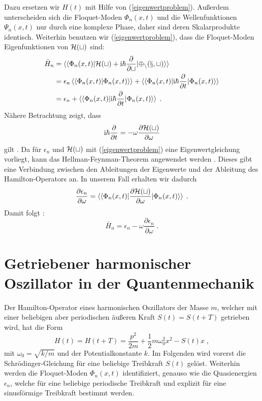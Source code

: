     Dazu ersetzen wir $H(t)$ mit Hilfe von (\ref{eigenwertproblem}).
    Außerdem unterscheiden sich die Floquet-Moden $\Phi_n(x,t)$ und die Wellenfunktionen $\Psi_n(x,t)$ nur durch eine komplexe Phase, daher sind deren Skalarprodukte identisch.
    Weiterhin benutzen wir (\ref{eigenwertproblem}), dass die Floquet-Moden Eigenfunktionen von $\cal{H}(t)$ sind:
    \begin{align}
      \begin{split}
      \bar{H}_n  &= \braket{\braket{\Phi_n(x,t)|\cal{H}(t)+\text{i}\hbar\frac{\partial}{\partial t}|\Phi_n(x,t)}} \\
      &=\epsilon_n \braket{\braket{\Phi_n(x,t)|\Phi_n(x,t)}} + \braket{\braket{\Phi_n(x,t)|\text{i}\hbar\frac{\partial}{\partial t}|\Phi_n(x,t)}} \\
      &= \epsilon_n + \braket{\braket{\Phi_n(x,t)|\text{i}\hbar\frac{\partial}{\partial t}|\Phi_n(x,t)}} \; .
    \end{split}
    \end{align}
    Nähere Betrachtung zeigt, dass
    \begin{equation}
      \text{i}\hbar\frac{\partial}{\partial t} = -\omega \frac{\partial \cal{H}(t)}{\partial \omega}
    \end{equation}
    gilt \cite{haengi}.
    Da für $\epsilon_n$ und $\cal H(t)$ mit (\ref{eigenwertproblem}) eine Eigenwertgleichung vorliegt, kann das Hellman-Feynman-Theorem angewendet werden \cite{hellmann}.
    Dieses gibt eine Verbindung zwischen den Ableitungen der Eigenwerte und der Ableitung des Hamilton-Operators an.
    In unserem Fall erhalten wir dadurch
    \begin{equation}
      \frac{\partial \epsilon_n}{\partial \omega} = \braket{\braket{\Phi_n(x,t)|\frac{\partial \cal H(t)}{\partial \omega}|\Phi_n(x,t)}} \; .
    \end{equation}
    Damit folgt \cite{haengi}:
    \begin{equation}
      \bar{H}_n = \epsilon_n - \omega\frac{\partial \epsilon_n}{\partial \omega} \; .
      \label{mittleres_H}
    \end{equation}

\iffalse
    \chapter{Getriebener harmonischer Oszillator in der Quantenmechanik}
      Der Hamilton-Operator eines harmonischen Oszillators der Masse $m$, welcher mit einer beliebigen aber periodischen äußeren Kraft $S(t)=S(t+T)$ getrieben wird, hat die Form
      \begin{equation}
        H(t) = H(t+T) = \frac{p^2}{2m} + \frac{1}{2}m\omega_0^2x^2-S(t)x \; ,
        \label{H_einzelner}
      \end{equation}
      mit $\omega_0=\sqrt{k/m}$ und der Potentialkonstante $k$.
      Im Folgenden wird vorerst die Schrödinger-Gleichung für eine beliebige Treibkraft $S(t)$ gelöst.
      Weiterhin werden die Floquet-Moden $\Phi_n(x,t)$ identifiziert, genauso wie die Quasienergien $\epsilon_n$, welche für eine beliebige periodische Treibkraft und explizit für eine sinusförmige Treibkraft bestimmt werden.

